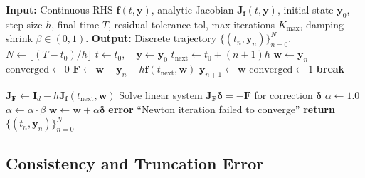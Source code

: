\documentclass[11pt,a4paper]{article}
\theoremstyle{definition}
\theoremstyle{remark}
\begin{document}
\begin{algorithm}[htbp]
\caption{Implicit Euler Integration with Damped Newton Solver}
\label{alg:implicit_euler_newton}
\footnotesize %
\begin{algorithmic}[1] %
\STATE \textbf{Input:} Continuous RHS $\mathbf{f}(t, \mathbf{y})$, analytic Jacobian $\mathbf{J}_{\mathbf{f}}(t, \mathbf{y})$, initial state $\mathbf{y}_0$, step size $h$, final time $T$, residual tolerance $\text{tol}$, max iterations $K_{\max}$, damping shrink $\beta \in (0, 1)$.
\STATE \textbf{Output:} Discrete trajectory $\{ (t_n, \mathbf{y}_n) \}_{n=0}^N$.
\STATE $N \gets \lfloor (T - t_0) / h \rfloor$
\STATE $t \gets t_0, \quad \mathbf{y} \gets \mathbf{y}_0$
    \STATE $t_{\text{next}} \gets t_0 + (n + 1)h$
    \STATE $\mathbf{w} \gets \mathbf{y}_n$ 
    \STATE $\text{converged} \gets 0$
        \STATE $\mathbf{F} \gets \mathbf{w} - \mathbf{y}_n - h \mathbf{f}(t_{\text{next}}, \mathbf{w})$
            \STATE $\mathbf{y}_{n+1} \gets \mathbf{w}$
            \STATE $\text{converged} \gets 1$
            \STATE \textbf{break}
        \ENDIF
        
        \STATE $\mathbf{J}_{\mathbf{F}} \gets \mathbf{I}_d - h \mathbf{J}_{\mathbf{f}}(t_{\text{next}}, \mathbf{w})$
        \STATE Solve linear system $\mathbf{J}_{\mathbf{F}} \boldsymbol{\delta} = -\mathbf{F}$ for correction $\boldsymbol{\delta}$
        \STATE $\alpha \gets 1.0$ 
            \STATE $\alpha \gets \alpha \cdot \beta$ 
        \ENDWHILE
        \STATE $\mathbf{w} \gets \mathbf{w} + \alpha \boldsymbol{\delta}$
    \ENDFOR
        \STATE \textbf{error} ``Newton iteration failed to converge''
    \ENDIF
\ENDFOR
\STATE \textbf{return} $\{ (t_n, \mathbf{y}_n) \}_{n=0}^N$
\end{algorithmic}
\end{algorithm}



\subsection{Consistency and Truncation Error}
\end{document}
